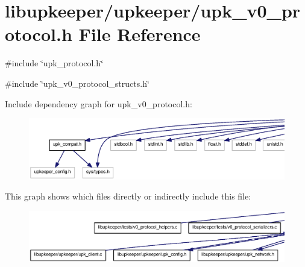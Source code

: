 \section{libupkeeper/upkeeper/upk\_\-v0\_\-protocol.h File Reference}
\label{upk__v0__protocol_8h}
{\ttfamily \#include \char`\"{}upk\_\-protocol.h\char`\"{}}\par
{\ttfamily \#include \char`\"{}upk\_\-v0\_\-protocol\_\-structs.h\char`\"{}}\par
Include dependency graph for upk\_\-v0\_\-protocol.h:
\nopagebreak
\begin{figure}[H]
\begin{center}
\leavevmode
\includegraphics[width=400pt]{upk__v0__protocol_8h__incl}
\end{center}
\end{figure}
This graph shows which files directly or indirectly include this file:\nopagebreak
\begin{figure}[H]
\begin{center}
\leavevmode
\includegraphics[width=400pt]{upk__v0__protocol_8h__dep__incl}
\end{center}
\end{figure}
